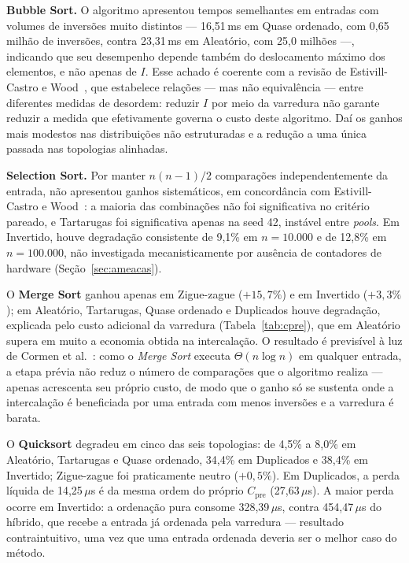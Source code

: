 \documentclass[12pt]{article}
\begin{document}
\textbf{Bubble Sort.} O algoritmo apresentou tempos semelhantes em entradas com volumes de inversões muito distintos --- 16,51\,ms em Quase ordenado, com 0,65 milhão de inversões, contra 23,31\,ms em Aleatório, com 25,0 milhões ---, indicando que seu desempenho depende também do deslocamento máximo dos elementos, e não apenas de $I$. Esse achado é coerente com a revisão de Estivill-Castro e Wood~\cite{estivill-castro_survey_1992}, que estabelece relações --- mas não equivalência --- entre diferentes medidas de desordem: reduzir $I$ por meio da varredura não garante reduzir a medida que efetivamente governa o custo deste algoritmo. Daí os ganhos mais modestos nas distribuições não estruturadas e a redução a uma única passada nas topologias alinhadas.

\textbf{Selection Sort.} Por manter $n(n-1)/2$ comparações independentemente da entrada, não apresentou ganhos sistemáticos, em concordância com Estivill-Castro e Wood~\cite{estivill-castro_survey_1992}: a maioria das combinações não foi significativa no critério pareado, e Tartarugas foi significativa apenas na seed 42, instável entre \emph{pools}. Em Invertido, houve degradação consistente de 9,1\% em $n=10.000$ e de 12,8\% em $n=100.000$, não investigada mecanisticamente por ausência de contadores de hardware (Seção~\ref{sec:ameacas}). 

O \textbf{Merge Sort} ganhou apenas em Zigue-zague ($+15,7\%$) e em Invertido ($+3,3\%$); em Aleatório, Tartarugas, Quase ordenado e Duplicados houve degradação, explicada pelo custo adicional da varredura (Tabela~\ref{tab:cpre}), que em Aleatório supera em muito a economia obtida na intercalação. O resultado é previsível à luz de Cormen et al.~\cite{cormen_introduction_2022}: como o \emph{Merge Sort} executa $\Theta(n \log n)$ em qualquer entrada, a etapa prévia não reduz o número de comparações que o algoritmo realiza --- apenas acrescenta seu próprio custo, de modo que o ganho só se sustenta onde a intercalação é beneficiada por uma entrada com menos inversões e a varredura é barata.

O \textbf{Quicksort} degradeu em cinco das seis topologias: de 4,5\% a 8,0\% em Aleatório, Tartarugas e Quase ordenado, 34,4\% em Duplicados e 38,4\% em Invertido; Zigue-zague foi praticamente neutro ($+0,5\%$). Em Duplicados, a perda líquida de 14,25\,$\mu$s é da mesma ordem do próprio $C_{\text{pre}}$ (27,63\,$\mu$s). A maior perda ocorre em Invertido: a ordenação pura consome 328,39\,$\mu$s, contra 454,47\,$\mu$s do híbrido, que recebe a entrada já ordenada pela varredura --- resultado contraintuitivo, uma vez que uma entrada ordenada deveria ser o melhor caso do método.
\end{document}
